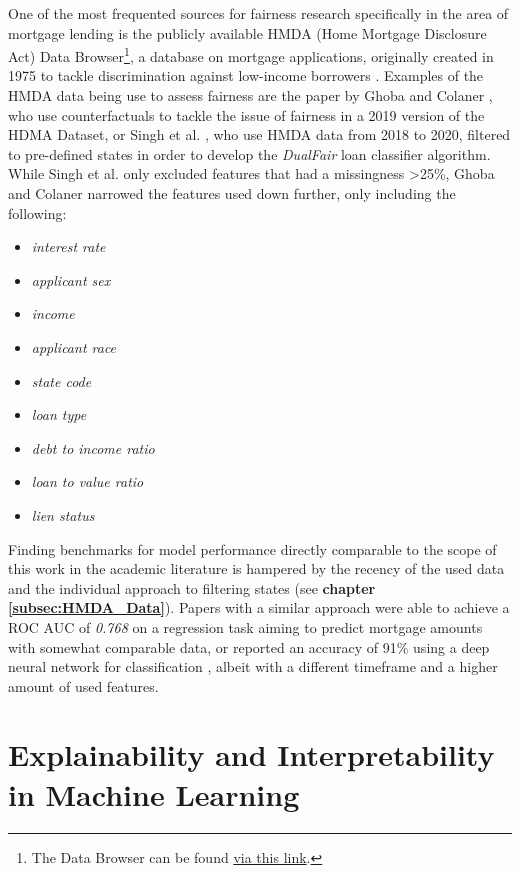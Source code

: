 One of the most frequented sources for fairness research specifically in the area of mortgage lending is the publicly available HMDA (Home Mortgage Disclosure Act) Data Browser\footnote{The Data Browser can be found \href{https://ffiec.cfpb.gov/data-browser/data/2022?category=states}{via this link}.}, a database on mortgage applications, originally created in 1975 to tackle discrimination against low-income borrowers \parencite{Bogen2020}.
Examples of the HMDA data being use to assess fairness are the paper by Ghoba and Colaner \parencite{Ghoba}, who use counterfactuals to tackle the issue of fairness in a 2019 version of the HDMA Dataset, or Singh et al. \parencite{Singh2022}, who use HMDA data from 2018 to 2020, filtered to pre-defined states in order to develop the \textit{DualFair} loan classifier algorithm. 
While Singh et al. only excluded features that had a missingness >25\%, Ghoba and Colaner narrowed the features used down further, only including the following:
\begin{itemize}
    \item \textit{interest rate}
    \item \textit{applicant sex}
    \item \textit{income}
    \item \textit{applicant race}
    \item \textit{state code}
    \item \textit{loan type}
    \item \textit{debt to income ratio}
    \item \textit{loan to value ratio}
    \item \textit{lien status}
\end{itemize}

Finding benchmarks for model performance directly comparable to the scope of this work in the academic literature is hampered by the recency of the used data and the individual approach to filtering states (see \textbf{chapter \ref{subsec:HMDA_Data}}).
Papers with a similar approach were able to achieve a ROC AUC of \textit{0.768} on a regression task aiming to predict mortgage amounts \parencite{Ghoba} with somewhat comparable data, 
or reported an accuracy of 91\% using a deep neural network for classification \parencite{Hodges2024}, albeit with a different timeframe and a higher amount of used features. 

\section{Explainability and Interpretability in Machine Learning}\label{sec:Explainability}

